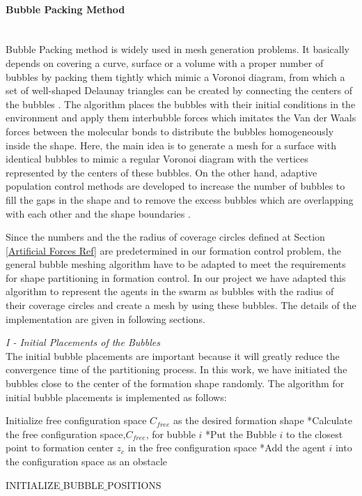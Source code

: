 \paragraph{Bubble Packing Method} \hspace{0pt} \\				
Bubble Packing method is widely used in mesh generation problems. It basically depends on covering a curve, surface or a volume with a proper number of bubbles by packing them tightly which mimic a Voronoi diagram, from which a set of well-shaped Delaunay triangles can be created by connecting the centers of the bubbles \cite{27}.  The algorithm places the bubbles with their initial conditions in the environment and apply them interbubble forces which imitates the Van der Waals forces between the molecular bonds  to distribute the bubbles homogeneously inside the shape. Here, the main idea is to generate a mesh for a surface with identical bubbles to mimic a regular Voronoi diagram with the vertices represented by the centers of these bubbles. On the other hand, adaptive population control  methods are developed to increase the number of bubbles to fill the gaps in the shape and to remove the excess bubbles which are overlapping with each other and the shape boundaries \cite{27}. 

Since the numbers and the the radius of coverage circles defined at Section \ref{Artificial Forces Ref} are predetermined in our formation control problem, the general bubble meshing algorithm have to be adapted to meet the requirements for shape partitioning in formation control.  In our project we have adapted this algorithm to represent the agents in the swarm as bubbles with the radius of their coverage circles and create a mesh by using these bubbles. The details of the implementation are given in following sections.\newline
			
\textit{			I - Initial Placements of the Bubbles} \\ 
The initial bubble placements are important because it will greatly reduce the convergence time of the partitioning process. In this work, we have initiated the bubbles close to the center of the formation shape randomly. The algorithm for initial bubble placements is implemented as follows:
			
\begin{algorithm}[H]
Initialize free configuration space $C_{free}$ as the desired formation shape \newline
{}
{		
*Calculate the free configuration space,$C_{free}$, for bubble $i$\;
*Put the Bubble $i$ to the closest point to  formation center  $z_c$  in the free configuration space\;
*Add the agent $i$ into the configuration space as an obstacle \;
}\		
\caption{INITIALIZE$\_$BUBBLE$\_$POSITIONS} \label{intial_buble}
\end{algorithm}
		
